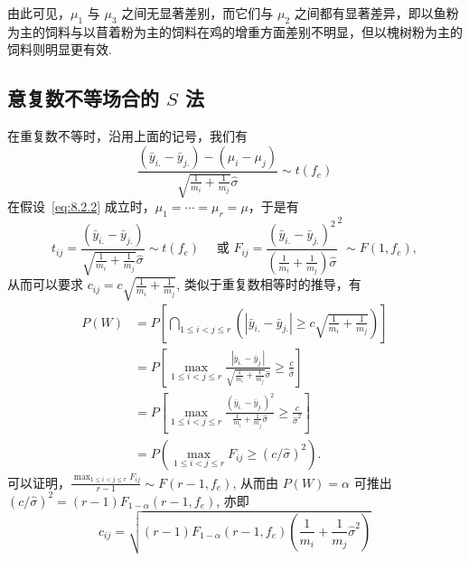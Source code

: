 由此可见，$\mu_1$ 与 $\mu_3$ 之间无显著差别，而它们与 $\mu_2$ 之间都有显著差异，即以鱼粉为主的饲料与以苜着粉为主的饲料在鸡的增重方面差别不明显，但以槐树粉为主的饲料则明显更有效.

\subsection[意复数不等场合的 S 法]{意复数不等场合的 $S$ 法}

在重复数不等时，沿用上面的记号，我们有
\begin{equation*}
  \frac{(\bar{y}_{i.} - \bar{y}_{j.}) - (\mu_i - \mu_j)}{\sqrt{\frac{1}{m_i}+\frac{1}{m_j}}\hat{\sigma}} \sim t(f_e)
\end{equation*}
在假设~\eqref{eq:8.2.2} 成立时，$\mu_1 = \cdots = \mu_r = \mu$，于是有
\begin{equation*}
  t_{ij} =   \frac{(\bar{y}_{i.} - \bar{y}_{j.})}{\sqrt{\frac{1}{m_i}+\frac{1}{m_j}}\hat{\sigma}} \sim t(f_e) \quad \text{ 或 } F_{ij} = \frac{(\bar{y}_{i.} - \bar{y}_{j.})^2}{\left(\frac{1}{m_i}+\frac{1}{m_j}\right)\hat{\sigma}}^2 \sim F(1, f_e),
\end{equation*}
从而可以要求 $c_{ij} = c \sqrt{\frac{1}{m_i}+\frac{1}{m_j}}$, 类似于重复数相等时的推导，有
\begin{align*}
  P(W) & = P \left[\bigcap_{1\leq i < j \leq r} \left(|\bar{y}_{i.} - \bar{y}_{j.}| \geq c \sqrt{\frac{1}{m_i}+\frac{1}{m_j}}\right)\right] \\
       & = P \left[\max_{1 \leq i < j \leq r} \frac{|\bar{y}_{i.} - \bar{y}_{j.}|}{\sqrt{\frac{1}{m_i}+\frac{1}{m_j}}\hat{\sigma}} \geq \frac{c}{\hat{\sigma}}\right] \\
       & = P \left[\max_{1 \leq i < j \leq r} \frac{(\bar{y}_{i.} - \bar{y}_{j.})^2}{\frac{1}{m_i}+\frac{1}{m_j}\hat{\sigma}} \geq \frac{c}{\hat{\sigma}^2}\right] \\
       & = P(\max_{1\leq i < j \leq r} F_{ij} \geq (c/\hat{\sigma})^2).
\end{align*}
可以证明，$\frac{\max_{1\leq i < j \leq r} F_{ij}}{r-1} \sim F(r-1, f_e)$, 从而由 $P(W)=\alpha$ 可推出 $(c/\hat{\sigma})^2 = (r-1) F_{1-\alpha} (r-1, f_e)$, 亦即
\begin{equation*}
  c_{ij} = \sqrt{(r-1) F_{1-\alpha}(r-1, f_e) \left(\frac{1}{m_i} + \frac{1}{m_j} \hat{\sigma}^2\right)}
\end{equation*}

